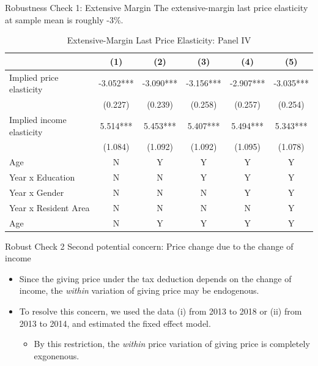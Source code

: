 \documentclass[
  ignorenonframetext,
]{beamer}
\providecommand{\tightlist}{%
  \setlength{\itemsep}{0pt}\setlength{\parskip}{0pt}}
\begin{document}
\begin{frame}{Robustness Check 1: Extensive Margin}
\protect\hypertarget{robustness-check-1-extensive-margin}{}
The extensive-margin last price elasticity at sample mean is roughly -3\%.

\begin{table}

\caption{\label{tab:kableLastElasticity2Slide2}Extensive-Margin Last Price Elasticity: Panel IV}
\centering
\fontsize{7}{9}\selectfont
\begin{tabular}[t]{lccccc}
\toprule
 & (1) & (2) & (3) & (4) & (5)\\
\midrule
Implied price elasticity & -3.052*** & -3.090*** & -3.156*** & -2.907*** & -3.035***\\
 & (0.227) & (0.239) & (0.258) & (0.257) & (0.254)\\
Implied income elasticity & 5.514*** & 5.453*** & 5.407*** & 5.494*** & 5.343***\\
 & (1.084) & (1.092) & (1.092) & (1.095) & (1.078)\\
Age & N & Y & Y & Y & Y\\
Year x Education & N & N & Y & Y & Y\\
Year x Gender & N & N & N & Y & Y\\
Year x Resident Area & N & N & N & N & Y\\
Age & N & Y & Y & Y & Y\\
\bottomrule
\end{tabular}
\end{table}
\end{frame}

\begin{frame}{Robust Check 2}
\protect\hypertarget{robust-check-2}{}
Second potential concern: Price change due to the change of income

\begin{itemize}
\tightlist
\item
  Since the giving price under the tax deduction depends on the change of income, the \emph{within} variation of giving price may be endogenous.
\item
  To resolve this concern, we used the data (i) from 2013 to 2018 or (ii) from 2013 to 2014, and estimated the fixed effect model.

  \begin{itemize}
  \tightlist
  \item
    By this restriction, the \emph{within} price variation of giving price is completely exgonenous.
  \end{itemize}
\end{itemize}
\end{frame}
\end{document}

